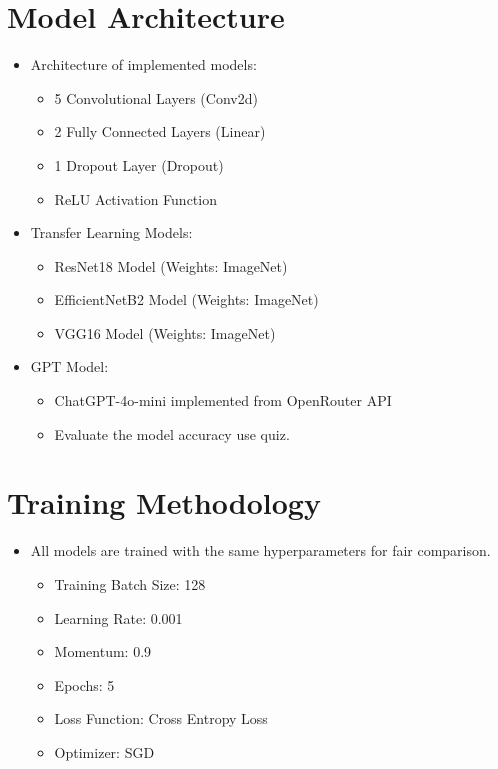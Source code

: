 \documentclass{article}
\begin{document}
\section{Model Architecture}
\begin{itemize}
    \item Architecture of implemented models:
    \begin{itemize}
        \item 5 Convolutional Layers (Conv2d)
        \item 2 Fully Connected Layers (Linear)
        \item 1 Dropout Layer (Dropout)
        \item ReLU Activation Function
    \end{itemize}
    \item Transfer Learning Models:
    \begin{itemize}
        \item ResNet18 Model (Weights: ImageNet)
        \item EfficientNetB2 Model (Weights: ImageNet)
        \item VGG16 Model (Weights: ImageNet)
    \end{itemize}
    \item GPT Model:
    \begin{itemize}
        \item ChatGPT-4o-mini implemented from OpenRouter API
        \item Evaluate the model accuracy use quiz.
    \end{itemize}
\end{itemize}

\section{Training Methodology}
\begin{itemize}
    \item All models are trained with the same hyperparameters for fair comparison.
    \begin{itemize}
        \item Training Batch Size: 128
        \item Learning Rate: 0.001
        \item Momentum: 0.9
        \item Epochs: 5
        \item Loss Function: Cross Entropy Loss
        \item Optimizer: SGD
    \end{itemize}
\end{itemize}
\end{document}
